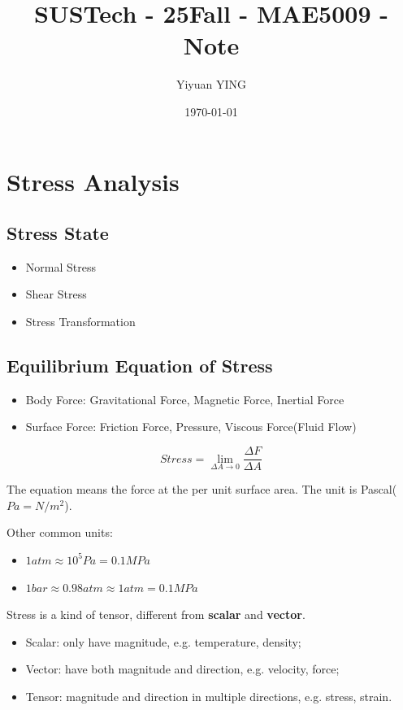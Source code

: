 \documentclass[en,hazy,cyan,8pt,normal]{elegantnote}
\title{SUSTech - 25Fall - MAE5009 - Note}
\author{Yiyuan YING}
\institute{Southern University of Science and Technology}
\date{\today}
\numberwithin{equation}{section}
\begin{document}
\maketitle

\section{Stress Analysis}
  \subsection{Stress State}
    \begin{itemize}
      \item Normal Stress
      \item Shear Stress
      \item Stress Transformation
    \end{itemize}

  \subsection{Equilibrium Equation of Stress}
    \begin{itemize}
      \item Body Force: Gravitational Force, Magnetic Force, Inertial Force
      \item Surface Force: Friction Force, Pressure, Viscous Force(Fluid Flow)
    \end{itemize}

    \begin{equation}\label{eq:001}
      Stress=\lim_{\Delta A \to 0} \frac{\Delta F}{\Delta A}
    \end{equation}

    The equation means the force at the per unit surface area. The unit is Pascal($Pa=N/m^2$).

    Other common units:
    \begin{itemize}
      \item $1 atm \approx 10^5 Pa = 0.1 MPa$
      \item $1 bar \approx 0.98 atm \approx 1 atm = 0.1 MPa$
    \end{itemize}

    Stress is a kind of tensor, different from \textbf{scalar} and \textbf{vector}.
    \begin{itemize}
      \item Scalar: only have magnitude, e.g. temperature, density;
      \item Vector: have both magnitude and direction, e.g. velocity, force;
      \item Tensor: magnitude and direction in multiple directions, e.g. stress, strain.
    \end{itemize}
\end{document}
